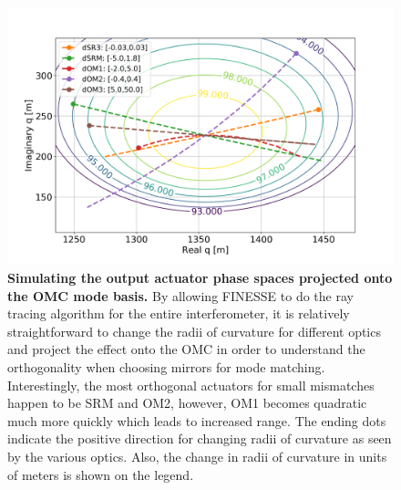 \begin{figure}[h]
	\centering
	\includegraphics[width=1.0 \textwidth]{../Figures/OutputAct_Gouyphase.png}
	\caption[Simulating the output actuator phase spaces projected onto the OMC mode basis.]
	{\textbf{Simulating the output actuator phase spaces projected onto the OMC mode basis.} 
	By allowing FINESSE to do the ray tracing algorithm for the entire interferometer, it is relatively straightforward to change the radii of curvature for different optics and project the effect onto the OMC in order to understand the orthogonality when choosing mirrors for mode matching.  Interestingly, the most orthogonal actuators for small mismatches happen to be SRM and OM2, however, OM1 becomes quadratic much more quickly which leads to increased range.  The ending dots indicate the positive direction for changing radii of curvature as seen by the various optics.  Also, the change in radii of curvature in units of meters is shown on the legend.
	}
	\label{fig:act_phase_space}
\end{figure}

